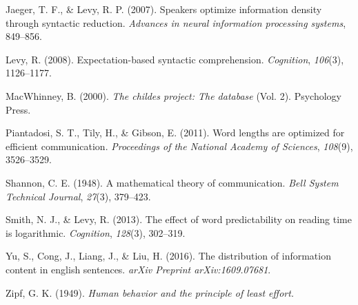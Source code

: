 \documentclass[11pt,]{article}
\begin{document}
\leavevmode\hypertarget{ref-jaeger2007speakers}{}%
Jaeger, T. F., \& Levy, R. P. (2007). Speakers optimize information density through syntactic reduction. \emph{Advances in neural information processing systems}, 849--856.

\leavevmode\hypertarget{ref-levy2008expectation}{}%
Levy, R. (2008). Expectation-based syntactic comprehension. \emph{Cognition}, \emph{106}(3), 1126--1177.

\leavevmode\hypertarget{ref-macwhinney2000childes}{}%
MacWhinney, B. (2000). \emph{The childes project: The database} (Vol. 2). Psychology Press.

\leavevmode\hypertarget{ref-piantadosi2011word}{}%
Piantadosi, S. T., Tily, H., \& Gibson, E. (2011). Word lengths are optimized for efficient communication. \emph{Proceedings of the National Academy of Sciences}, \emph{108}(9), 3526--3529.

\leavevmode\hypertarget{ref-shannon1948mathematical}{}%
Shannon, C. E. (1948). A mathematical theory of communication. \emph{Bell System Technical Journal}, \emph{27}(3), 379--423.

\leavevmode\hypertarget{ref-smith2013effect}{}%
Smith, N. J., \& Levy, R. (2013). The effect of word predictability on reading time is logarithmic. \emph{Cognition}, \emph{128}(3), 302--319.

\leavevmode\hypertarget{ref-yu2016distribution}{}%
Yu, S., Cong, J., Liang, J., \& Liu, H. (2016). The distribution of information content in english sentences. \emph{arXiv Preprint arXiv:1609.07681}.

\leavevmode\hypertarget{ref-zipf1949human}{}%
Zipf, G. K. (1949). \emph{Human behavior and the principle of least effort.}
\end{document}
